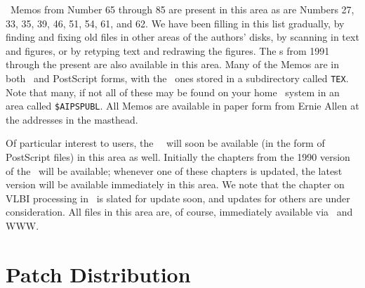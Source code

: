 \AIPS\ Memos from Number 65 through 85 are present in this area as are
Numbers 27, 33, 35, 39, 46, 51, 54, 61, and 62.  We have been filling
in this list gradually, by finding and fixing old files in other areas
of the authors' disks, by scanning in text and figures, or by retyping
text and redrawing the figures.  The \Aipsletter s from 1991 through
the present are also available in this area.  Many of the Memos are in
both \TEX\ and PostScript forms, with the \TEX\ ones stored in a
subdirectory called \hbox{{\tt TEX}}.  Note that many, if not all of
these may be found on your home \AIPS\ system in an area called
\hbox{{\tt \$AIPSPUBL}}.  All Memos are available in paper form from
Ernie Allen at the addresses in the masthead.

Of particular interest to users, the \AIPS\ \Cookbook\ will soon be
available (in the form of PostScript files) in this area as well.
Initially the chapters from the 1990 version of the \Cookbook\ will be
available;  whenever one of these chapters is updated, the latest
version will be available immediately in this area.  We note that the
chapter on VLBI processing in \AIPS\ is slated for update soon, and
updates for others are under consideration.  All files in this area
are, of course, immediately available via \ftp\ and \hbox{WWW}.

\section{Patch Distribution}

